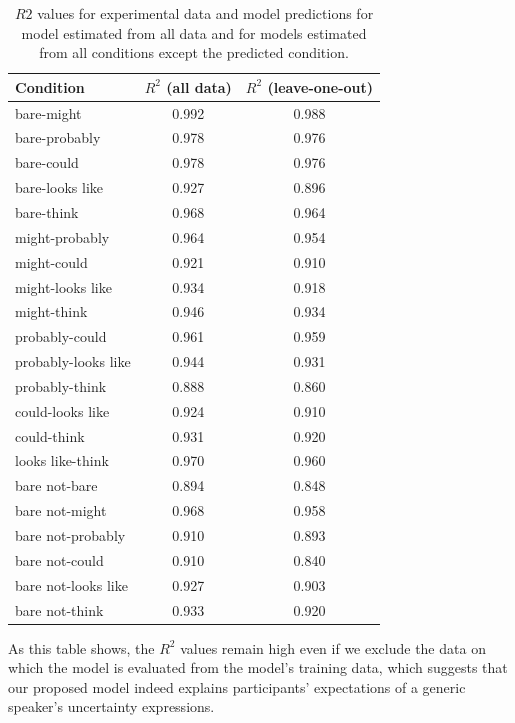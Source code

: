 \documentclass[lucida,biblatex]{sp} %
\begin{document}
\begin{table}
\center
\begin{tabular}{l | c | c}
      Condition & $R^2$ (all data) & $R^2$ (leave-one-out) \\
      \midrule
          bare-might  &  0.992  & 0.988 \\
       bare-probably  &  0.978  & 0.976 \\
          bare-could  &  0.978  & 0.976 \\
     bare-looks like  &  0.927  & 0.896 \\
          bare-think  &  0.968  & 0.964 \\
      might-probably  &  0.964  & 0.954 \\
         might-could  &  0.921  & 0.910 \\
    might-looks like  &  0.934  & 0.918 \\
         might-think  &  0.946  & 0.934 \\
      probably-could  &  0.961  & 0.959 \\
 probably-looks like  &  0.944  & 0.931 \\
      probably-think  &  0.888  & 0.860 \\
    could-looks like  &  0.924  & 0.910 \\
         could-think  &  0.931  & 0.920 \\
    looks like-think  &  0.970  & 0.960 \\
       bare not-bare  &  0.894  & 0.848 \\
      bare not-might  &  0.968  & 0.958 \\
   bare not-probably  &  0.910  & 0.893 \\
      bare not-could  &  0.910  & 0.840 \\
 bare not-looks like  &  0.927  & 0.903 \\
      bare not-think  &  0.933  & 0.920 \\
\end{tabular}
\caption{$R2$ values for experimental data and model predictions for model estimated from all data and for models estimated from all conditions except the predicted condition. \label{tbl:correlations}}
\end{table}


As this table shows, the $R^2$ values remain high even if we exclude the data on which the model is evaluated from the model's training data, 
which suggests that our proposed model indeed explains
participants' expectations of a generic speaker's uncertainty expressions.
\end{document}

